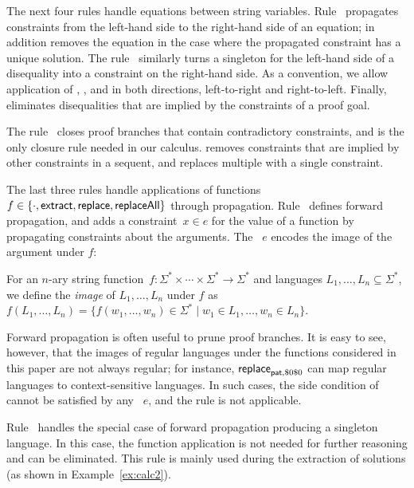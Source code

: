 The next four rules handle equations between string
variables. Rule~ propagates \regexp{} constraints from
the left-hand side to the right-hand side of an equation;
 in addition removes the equation in the case
where the propagated constraint has a unique solution. The
rule~ similarly turns a singleton \regexp{}
for the left-hand side of a disequality into a \regexp{} constraint on the
right-hand side.  As a convention, we allow application of
, , and
 in both directions, left-to-right and
right-to-left. Finally,  eliminates
disequalities that are implied by the \regexp{} constraints of a proof
goal.

The rule~ closes proof branches that contain
contradictory \regexp{} constraints, and is the only closure rule needed
in our calculus.  removes \regexp{} constraints
that are implied by other constraints in a sequent, and
 replaces multiple \regexps{} with a single
constraint.

The last three rules handle applications of functions
$f \in \{\cdot, \mathsf{extract}, \mathsf{replace}, \mathsf{replaceAll}\}$ through
propagation. Rule~ defines forward propagation, and
adds a \regexp{} constraint~$x \in e$ for the value of a function by
propagating constraints about the arguments. The \regexp{}~$e$ encodes
the image of the argument \regexps{} under $f$:
%
\begin{definition}[Image]
  For an $n$-ary string
  function~$f : \Sigma^* \times \cdots \times \Sigma^* \to \Sigma^*$
  and languages $L_1, \ldots, L_n \subseteq \Sigma^*$, we define the
  \emph{image} of $L_1, \ldots, L_n$ under $f$ as
  $f(L_1, \ldots, L_n) = \{f(w_1, \ldots, w_n) \in \Sigma^* \mid w_1
  \in L_1, \ldots, w_n \in L_n \}$.
\end{definition}

Forward propagation is often useful to prune proof branches. It is
easy to see, however, that the images of regular languages under the
functions considered in this paper are not always regular; for
instance, $\mathsf{replace}_{\mathsf{pat},\$0\$0}$ can map regular languages to
context-sensitive languages. In such cases, the side condition of
 cannot be satisfied by any \regexp{}~$e$, and the rule
is not applicable.

Rule~ handles the special case of forward
propagation producing a singleton language. In this case, the function
application is not needed for further reasoning and can be
eliminated. This rule is mainly used during the extraction of
solutions (as shown in Example~\ref{ex:calc2}).

